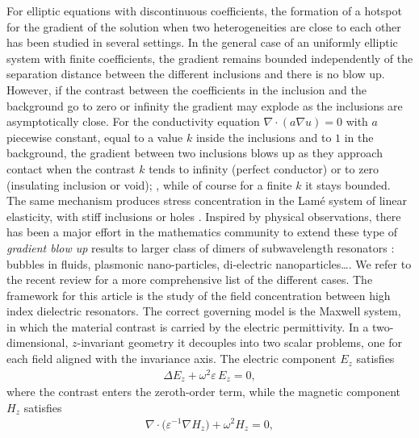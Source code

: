 \documentclass[10pt]{article}
\numberwithin{equation}{section}
\begin{document}
For elliptic equations with discontinuous coefficients, the formation of a hotspot for the gradient of the solution when two heterogeneities are close to each other has been studied in several settings.  In the general case of an uniformly elliptic system with finite coefficients, the gradient remains bounded independently of the separation distance between the different inclusions  \cite{bonnetier2000elliptic,li2000gradient,li2003estimates} and there is no blow up.  However,  if the contrast between the coefficients in the inclusion and the background go to zero or infinity the gradient may explode as the inclusions are asymptotically close. For the
conductivity equation $\nabla\cdot(a\nabla u)=0$ with $a$ piecewise constant,
equal to a value $k$ inside the inclusions and to $1$ in the background, the
gradient between two inclusions blows up as they approach contact when the
contrast $k$ tends to infinity (perfect conductor) or to zero (insulating
inclusion or void); \cite{ammari2005gradient,
ammari2007estimates, ammari2015elliptic, bao2009gradient, ciraolo2019gradient,
chen2021optimal, kang2021singular},  while of course for a finite $k$ it stays bounded. The same mechanism produces stress concentration in the Lam\'e system of linear elasticity, with stiff inclusions
or holes \cite{kang2019quantitative, ammari2013spectral, lim2017stress}. 
Inspired by physical observations, there has been a major effort in the mathematics community to extend these type of \emph{gradient blow up} results to larger class of dimers of subwavelength resonators : bubbles in fluids,  plasmonic nano-particles,  di-electric nanoparticles\ldots  \cite{ammari2020close,yu2019hybridization,bonnetier2019plasmonic, li2025resonant}. We refer to the recent review \cite{kang2021singular} for a more comprehensive list of the different cases.
The framework for this article is the study of the field concentration between high index dielectric resonators.  The correct governing model is the Maxwell system,  in which the material contrast is carried by the electric permittivity. In a
two-dimensional, $z$-invariant geometry it decouples into two scalar problems,
one for each field aligned with the invariance axis. The electric component
$E_z$ satisfies
\begin{align}\label{eq:scalarE}
    \Delta E_z + \omega^2 \varepsilon\, E_z = 0,
\end{align}
where the contrast enters the zeroth-order term, while the magnetic component
$H_z$ satisfies
\begin{align*}
    \nabla\cdot\big(\varepsilon^{-1}\nabla H_z\big) + \omega^2 H_z = 0,
\end{align*}
\end{document}
